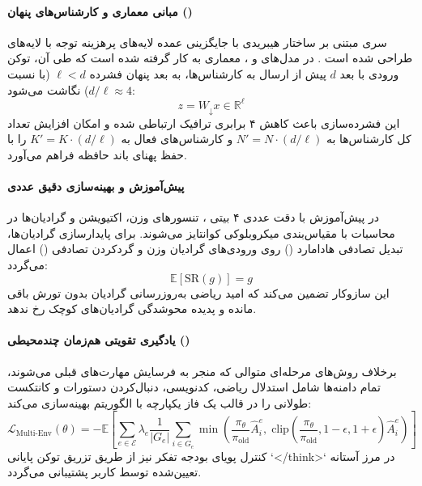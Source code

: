 \item {}

\paragraph*{مبانی معماری و کارشناس‌های پنهان ()}
سری  مبتنی بر ساختار هیبریدی  با جایگزینی عمده لایه‌های پرهزینه توجه با لایه‌های  طراحی شده است \cite{nemotron2025v3}. در مدل‌های  و ، معماری  به کار گرفته شده است که طی آن، توکن ورودی با بعد $d$ پیش از ارسال به کارشناس‌ها، به بعد پنهان فشرده $\ell < d$ (با نسبت $d/\ell \approx 4$) نگاشت می‌شود:
\begin{equation}
    z = W_{\downarrow} x \in \mathbb{R}^\ell
\end{equation}
این فشرده‌سازی باعث کاهش ۴ برابری ترافیک ارتباطی  شده و امکان افزایش تعداد کل کارشناس‌ها به $N' = N \cdot (d/\ell)$ و کارشناس‌های فعال به $K' = K \cdot (d/\ell)$ را با حفظ پهنای باند حافظه فراهم می‌آورد.

\paragraph*{پیش‌آموزش  و بهینه‌سازی دقیق عددی}
در پیش‌آموزش با دقت عددی ۴ بیتی ، تنسورهای وزن، اکتیویشن و گرادیان‌ها در محاسبات  با مقیاس‌بندی میکروبلوکی کوانتایز می‌شوند. برای پایدارسازی گرادیان‌ها، تبدیل تصادفی هادامارد () روی ورودی‌های گرادیان وزن و گردکردن تصادفی () اعمال می‌گردد:
\begin{equation}
    \mathbb{E}[\text{SR}(g)] = g
\end{equation}
این سازوکار تضمین می‌کند که امید ریاضی به‌روزرسانی گرادیان بدون تورش باقی مانده و پدیده محوشدگی گرادیان‌های کوچک رخ ندهد.

\paragraph*{یادگیری تقویتی هم‌زمان چندمحیطی ()}
برخلاف روش‌های مرحله‌ای متوالی که منجر به فرسایش مهارت‌های قبلی می‌شوند،  تمام دامنه‌ها شامل استدلال ریاضی، کدنویسی، دنبال‌کردن دستورات و کانتکست طولانی را در قالب یک فاز یکپارچه با الگوریتم  بهینه‌سازی می‌کند:
\begin{equation}
    \mathcal{L}_{\text{Multi-Env}}(\theta) = -\mathbb{E} \left[ \sum_{e \in \mathcal{E}} \lambda_e \frac{1}{|G_e|} \sum_{i \in G_e} \min\left( \frac{\pi_\theta}{\pi_{\text{old}}} \hat{A}_i^e, \; \text{clip}\left(\frac{\pi_\theta}{\pi_{\text{old}}}, 1-\epsilon, 1+\epsilon\right) \hat{A}_i^e \right) \right]
\end{equation}
کنترل پویای بودجه تفکر نیز از طریق تزریق توکن پایانی `</think>` در مرز آستانه تعیین‌شده توسط کاربر پشتیبانی می‌گردد.

